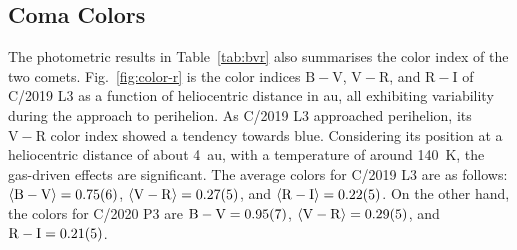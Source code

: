 \begin{comment}
        
\begin{figure}[h]
    \ContinuedFloat
    
    \begin{subfigure}{\textwidth}
    \centering
    \texttt{[image: Afrho\_C2019\_1.pdf]}
    \caption{Second subfigure.}
    \label{fig:second}
    \end{subfigure}
    \begin{subfigure}{\textwidth}
    \centering
    \texttt{[image: Afrho\_C2019\_2.pdf]}
    \caption{Third subfigure.}
    \label{fig:third}
    \end{subfigure}
    
    \caption{Page breaks and subfigures.}
    \label{fig:figures}
    
\end{figure}
\end{comment}




\subsection{Coma Colors}

The photometric results in Table~\ref{tab:bvr} also summarises the color index of the two comets. 
Fig.~\ref{fig:color-r} is the color indices $\mathrm{B}-\mathrm{V}$, $\mathrm{V}-\mathrm{R}$, and $\mathrm{R}-\mathrm{I}$ of C/2019 L3 as a function of heliocentric distance in \si{\astronomicalunit}, all exhibiting variability during the approach to perihelion. 
As C/2019 L3 approached perihelion, its $\mathrm{V}-\mathrm{R}$ color index showed a tendency towards blue. 
Considering its position at a heliocentric distance of about {\SI{4}{\astronomicalunit}}, with a temperature of around {\SI{140}{\K}}, the gas-driven effects are significant. 
The average colors for C/2019 L3 are as follows: 
$\langle \mathrm{B} - \mathrm{V} \rangle = \num{0.75 +- 0.06}$, 
$\langle \mathrm{V} - \mathrm{R} \rangle = \num{0.27 +- 0.05}$, and 
$\langle \mathrm{R} - \mathrm{I} \rangle = \num{0.22 +- 0.05}$. 
On the other hand, the colors for C/2020 P3 are 
$\mathrm{B} - \mathrm{V} = \num{0.95 +- 0.07}$, 
$\langle \mathrm{V} - \mathrm{R} \rangle = \num{0.29 +- 0.05}$, and 
$\mathrm{R} - \mathrm{I} = \num{0.21 +- 0.05}$. 

